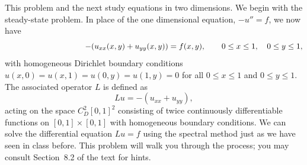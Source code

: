 This problem and the next study equations in two dimensions.  
We begin with the steady-state problem.  
In place of the one dimensional equation, $-u'' = f$, we now have
\[ \hspace*{10em}-(u_{xx}(x,y) +u_{yy}(x,y)) = f(x,y), 
   \qquad 0\le x \le 1, \quad 0\le y\le 1,\]
with homogeneous Dirichlet boundary conditions $u(x,0)=u(x,1)=u(0,y)=u(1,y)=0$ 
for all $0\le x\le 1$ and $0\le y\le 1$.
The associated operator $L$ is defined as
\[ L u = -(u_{xx} + u_{yy}),\]
acting on the space $C^2_D[0,1]^2$ consisting of twice continuously differentiable 
functions on $[0,1]\times[0,1]$ with homogeneous boundary conditions.
We can solve the differential equation $Lu=f$ using the spectral method just as we
have seen in class before.
This problem will walk you through the process;  
you may consult Section~8.2 of the text for hints.

